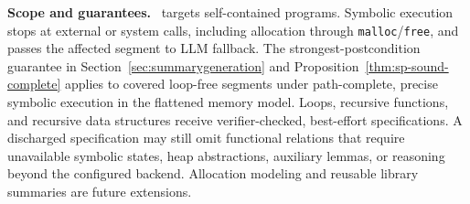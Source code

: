 
\smallskip
\noindent\textbf{Scope and guarantees.}
\toolname\ targets self-contained programs. Symbolic execution stops at external or system calls, including allocation through \texttt{malloc}/\texttt{free}, and passes the affected segment to LLM fallback. The strongest-postcondition guarantee in Section~\ref{sec:summarygeneration} and Proposition~\ref{thm:sp-sound-complete} applies to covered loop-free segments under path-complete, precise symbolic execution in the flattened memory model. Loops, recursive functions, and recursive data structures receive verifier-checked, best-effort specifications. A discharged specification may still omit functional relations that require unavailable symbolic states, heap abstractions, auxiliary lemmas, or reasoning beyond the configured backend. Allocation modeling and reusable library summaries are future extensions.

